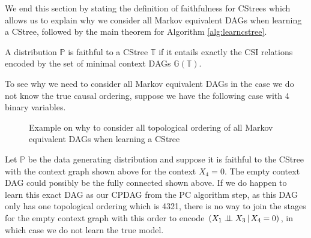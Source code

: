 \documentclass{tufte-book}
\begin{document}





We end this section by stating the definition of faithfulness for CStrees which allows us to explain why we consider all Markov equivalent DAGs when learning a CStree, followed by the main theorem for Algorithm \ref{alg:learncstree}.

\begin{definition}\label{def:faithfulnesscstrees}
A distribution $\mathbb{P}$ is faithful to a CStree $\mathbb{T}$ if it entails exactly the CSI relations encoded by the set of minimal context DAGs $\mathbb{G}(\mathbb{T})$.
\end{definition}

To see why we need to consider all Markov equivalent DAGs in the case we do not know the true causal ordering, suppose we have the following case with 4 binary variables.


\begin{figure}[!h]\label{fig:dagtocstree_cstree}
   \begin{floatrow}
%
\caption{Example on why to consider all topological ordering of all Markov equivalent DAGs when learning a CStree}
        
   \end{floatrow}
\end{figure}


Let \(\mathbb{P}\) be the data generating distribution and suppose it is faithful to the CStree with the context graph shown above for the context \(X_4=0\). The empty context DAG could possibly be the fully connected shown above. If we do happen to learn this exact DAG as our CPDAG from the PC algorithm step, as this DAG only has one topological ordering which is 4321, there is no way to join the stages for the empty context graph with this order to encode \((X_1 \perp \!\!\! \perp X_3 \,|\,X_4=0)\), in which case we do not learn the true model.
\end{document}
